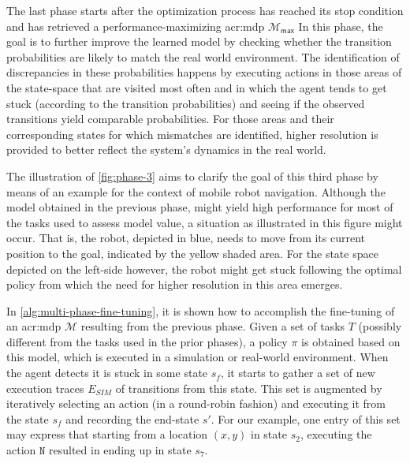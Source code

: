 The last phase starts after the optimization process has reached its stop condition and has retrieved a performance-maximizing \acrshort{acr:mdp} $\mathcal{M}_\mathsf{max}$
In this phase, the goal is to further improve the learned model by checking whether the transition probabilities are likely to match the real world environment.
The identification of discrepancies in these probabilities happens by executing actions in those areas of the state-space that are visited most often and in which the agent tends to get stuck (according to the transition probabilities) and seeing if the observed transitions yield comparable probabilities.
For those areas and their corresponding states for which mismatches are identified, higher resolution is provided to better reflect the system's dynamics in the real world.

\newpage

The illustration of \autoref{fig:phase-3} aims to clarify the goal of this third phase by means of an example for the context of mobile robot navigation.
Although the model obtained in the previous phase, might yield high performance for most of the tasks used to assess model value, a situation as illustrated in this figure might occur.
That is, the robot, depicted in blue, needs to move from its current position to the goal, indicated by the yellow shaded area.
For the state space depicted on the left-side however, the robot might get stuck following the optimal policy from which the need for higher resolution in this area emerges.

In \autoref{alg:multi-phase-fine-tuning}, it is shown how to accomplish the fine-tuning of an \acrshort{acr:mdp} $\mathcal{M}$ resulting from the previous phase.
Given a set of tasks $T$ (possibly different from the tasks used in the prior phases), a policy $\pi$ is obtained based on this model, which is executed in a simulation or real-world environment.
When the agent detects it is stuck in some state $s_f$, it starts to gather a set of new execution traces $E_\mathit{SIM}$ of transitions from this state.
This set is augmented by iteratively selecting an action (in a round-robin fashion) and executing it from the state $s_f$ and recording the end-state $s'$.
For our example, one entry of this set may express that starting from a location $(x, y)$ in state $s_2$, executing the action $\texttt{N}$ resulted in ending up in state $s_7$.



